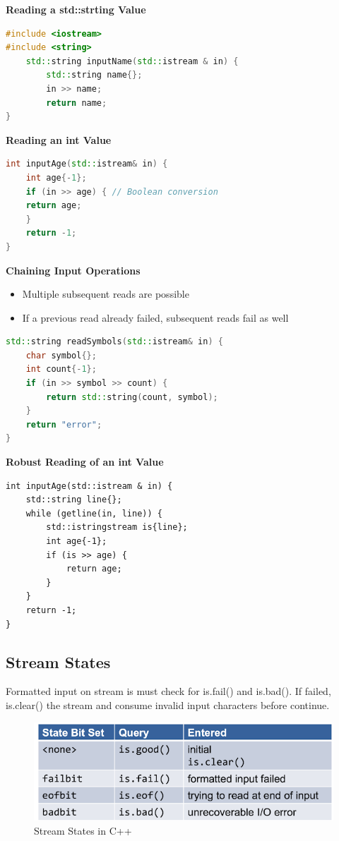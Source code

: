 \textbf{Reading a std::strting Value }
\begin{lstlisting}[language=C++]
#include <iostream> 
#include <string>
	std::string inputName(std::istream & in) {
		std::string name{};
		in >> name;
		return name; 
}	
\end{lstlisting}
\textbf{Reading an int Value}
\begin{lstlisting}[language=C++]
int inputAge(std::istream& in) {
	int age{-1};
	if (in >> age) { // Boolean conversion
	return age; 
	} 
	return -1;
}
\end{lstlisting}
\textbf{Chaining Input Operations}
\begin{itemize}
  \itemsep -0.5em 
  \item Multiple subsequent reads are possible 
  \item If a previous read already failed, subsequent reads fail as well
\end{itemize}

\begin{lstlisting}[language=C++]
std::string readSymbols(std::istream& in) {
	char symbol{};
	int count{-1};
	if (in >> symbol >> count) {
		return std::string(count, symbol); 
	} 
	return "error";
}
\end{lstlisting}

\textbf{Robust Reading of an int Value}
\begin{lstlisting}
int inputAge(std::istream & in) {
	std::string line{};
	while (getline(in, line)) {
		std::istringstream is{line}; 
		int age{-1}; 
		if (is >> age) {
			return age;
		} 
	}	
	return -1;
}
\end{lstlisting}

\subsection{Stream States}
Formatted input on stream  is must check for is.fail() and is.bad(). If failed, is.clear() the stream and consume invalid input characters before continue.

\begin{figure}[h!]
  \centering
  \includegraphics[width=0.6\linewidth]{images/streamstates}
  \caption{Stream States in C++}
\end{figure}

